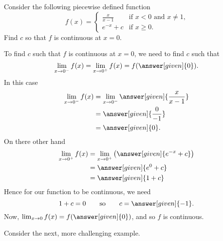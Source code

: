 \documentclass{ximera}
\begin{document}
\begin{example}
Consider the following piecewise defined function
\[
f(x) = 
\begin{cases}
  \frac{x}{x-1} &\text{if $x<0$ and $x\ne 1$,}\\
  e^{-x} + c &\text{if $x\ge 0$}.
\end{cases}
\]
Find $c$ so that $f$ is continuous at $x=0$.
\begin{explanation}
  To find $c$ such that $f$ is continuous at $x=0$, we need to find
  $c$ such that
  \[
  \lim_{x\to 0^-} f(x) = \lim_{x\to 0^+}f(x) = f(\answer[given]{0}).
  \]
  In this case
  \begin{align*}
    \lim_{x\to 0^-} f(x) &= \lim_{x\to 0^-}\answer[given]{\frac{x}{x-1}}\\
    &= \answer[given]{\frac{0}{-1}}\\
    &=\answer[given]{0}.
  \end{align*}
  On there other hand
  \begin{align*}
    \lim_{x\to 0^+} f(x) &= \lim_{x\to 0^+}\left(\answer[given]{e^{-x}+c}\right)\\
    &= \answer[given]{e^0 + c}\\
    &= \answer[given]{1+ c}
  \end{align*}
  Hence for our function to be continuous, we need
  \[
  1 + c = 0\qquad\text{so}\qquad c = \answer[given]{-1}.
  \]
  Now, $\lim_{x\to 0} f(x) = f(\answer[given]{0})$, and so $f$ is continuous.
\end{explanation}
\end{example}


Consider the next, more challenging example.
\end{document}
